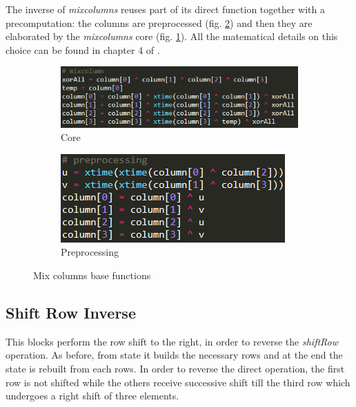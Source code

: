 \documentclass{article}
\begin{document}
The inverse of \textit{mixcolumns} reuses part of its direct function together with a precomputation: the columns are preprocessed (fig. \ref{fig:preprocessing}) and then they are elaborated by the \textit{mixcolumns} core (fig. \ref{fig:core}). All the matematical details on this choice can be found in chapter 4 of \cite{10.5555/560131}. 

\begin{figure}[H]
\centering
\begin{subfigure}{.54\textwidth}
  \centering
  \includegraphics[width=1\linewidth]{images/mixcolumn.png}
  \caption{Core}
  \label{fig:core}
\end{subfigure}
\begin{subfigure}{.35\textwidth}
  \centering
  \includegraphics[width=1\linewidth]{images/preprocessing.png}
  \caption{Preprocessing}
  \label{fig:preprocessing}
\end{subfigure}
\caption{Mix columns base functions}
\label{fig:MixColumns}
\end{figure}

\subsection{Shift Row Inverse}

This blocks perform the row shift to the right, in order to reverse the \textit{shiftRow} operation. As before, from state it builds the necessary rows and at the end the state is rebuilt from each rows. In order to reverse the direct operation, the first row is not shifted while the others receive successive shift till the third row which undergoes a right shift of three elements.
\end{document}

